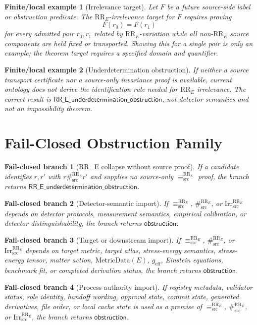 \documentclass[11pt]{article}
\newcommand{\RRE}{\mathrm{RR}_E}
\newcommand{\EqRR}{\equiv^{\RRE}_{\mathrm{src}}}
\newcommand{\SepRR}{\#^{\RRE}_{\mathrm{src}}}
\newcommand{\IrrRR}{\mathrm{Irr}^{\RRE}_{\mathrm{src}}}
\newcommand{\Obstruction}{\mathsf{obstruction}}
\newcommand{\RRUnder}{\mathsf{RR\_E\_underdetermination\_obstruction}}
\newcommand{\MetricData}{\mathrm{MetricData}}
\newcommand{\geff}{g_{\mathrm{eff}}}
\newtheorem{example}{Finite/local example}
\newtheorem{failure}{Fail-closed branch}
\begin{document}
\begin{example}[Irrelevance target]
Let \(F\) be a future source-side label or obstruction predicate. The
\(\RRE\)-irrelevance target for \(F\) requires proving
\[
  F(r_0)=F(r_1)
\]
for every admitted pair \(r_0,r_1\) related by \(\RRE\)-variation while all
non-\(\RRE\) source components are held fixed or transported. Showing this for
a single pair is only an example; the theorem target requires a specified
domain and quantifier.
\end{example}

\begin{example}[Underdetermination obstruction]
If neither a source transport certificate nor a source-only invariance proof
is available, current ontology does not derive the identification rule needed
for \(\RRE\) irrelevance. The correct result is
\(\RRUnder\), not detector semantics and not an impossibility theorem.
\end{example}

\section{Fail-Closed Obstruction Family}

\begin{failure}[RR\_E collapse without source proof]
If a candidate identifies \(r,r'\) with \(r\SepRR r'\) and supplies no
source-only \(\EqRR\) proof, the branch returns \(\RRUnder\).
\end{failure}

\begin{failure}[Detector-semantic import]
If \(\EqRR\), \(\SepRR\), or \(\IrrRR\) depends on detector protocols,
measurement semantics, empirical calibration, or detector distinguishability,
the branch returns \(\Obstruction\).
\end{failure}

\begin{failure}[Target or downstream import]
If \(\EqRR\), \(\SepRR\), or \(\IrrRR\) depends on target metric, target
atlas, stress-energy semantics, stress-energy tensor, matter action,
\(\MetricData(E)\), \(\geff\), Einstein equations, benchmark fit, or completed
derivation status, the branch returns \(\Obstruction\).
\end{failure}

\begin{failure}[Process-authority import]
If registry metadata, validator status, role identity, handoff wording,
approval state, commit state, generated derivatives, file order, or local
cache state is used as a premise of \(\EqRR\), \(\SepRR\), or \(\IrrRR\), the
branch returns \(\Obstruction\).
\end{failure}
\end{document}
